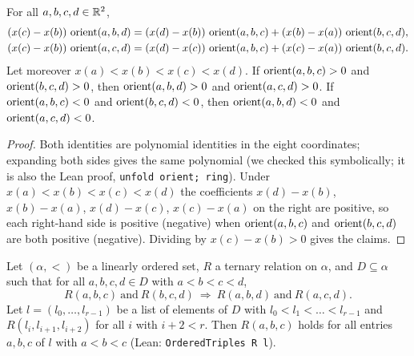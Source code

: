 \begin{lemma}\label{mb:lem:four}\raggedright
For all $a,b,c,d\in\mathbb R^2$,
\begin{align}
(x(c)-x(b))\,\operatorname{orient}(a,b,d)&=(x(d)-x(b))\,\operatorname{orient}(a,b,c)+(x(b)-x(a))\,\operatorname{orient}(b,c,d),\label{mb:eq:four-left}\\
(x(c)-x(b))\,\operatorname{orient}(a,c,d)&=(x(d)-x(c))\,\operatorname{orient}(a,b,c)+(x(c)-x(a))\,\operatorname{orient}(b,c,d).\label{mb:eq:four-right}
\end{align}
Let moreover $x(a)<x(b)<x(c)<x(d)$. If $\operatorname{orient}(a,b,c)>0$ and $\operatorname{orient}(b,c,d)>0$, then $\operatorname{orient}(a,b,d)>0$ and
$\operatorname{orient}(a,c,d)>0$. If $\operatorname{orient}(a,b,c)<0$ and $\operatorname{orient}(b,c,d)<0$, then $\operatorname{orient}(a,b,d)<0$ and $\operatorname{orient}(a,c,d)<0$.
\end{lemma}

\begin{proof}
Both identities are polynomial identities in the eight coordinates; expanding both sides gives the same polynomial (we
checked this symbolically; it is also the Lean proof, \texttt{unfold orient; ring}). Under $x(a)<x(b)<x(c)<x(d)$ the
coefficients $x(d)-x(b)$, $x(b)-x(a)$, $x(d)-x(c)$, $x(c)-x(a)$ on the right are positive, so each right-hand side is
positive (negative) when $\operatorname{orient}(a,b,c)$ and $\operatorname{orient}(b,c,d)$ are both positive (negative). Dividing by
$x(c)-x(b)>0$ gives the claims.
\end{proof}

\begin{lemma}\label{mb:lem:chain}\raggedright
Let $(\alpha,<)$ be a linearly ordered set, $R$ a ternary relation on $\alpha$, and $D\subseteq\alpha$ such that for all
$a,b,c,d\in D$ with $a<b<c<d$,
\begin{equation}\label{mb:eq:trans}
R(a,b,c)\ \text{and}\ R(b,c,d)\ \Longrightarrow\ R(a,b,d)\ \text{and}\ R(a,c,d).
\end{equation}
Let $l=(l_0,\dots,l_{r-1})$ be a list of elements of $D$ with $l_0<l_1<\dots<l_{r-1}$ and
$R(l_i,l_{i+1},l_{i+2})$ for all $i$ with $i+2<r$. Then $R(a,b,c)$ holds for all entries $a,b,c$ of $l$ with $a<b<c$
(Lean: \texttt{OrderedTriples R l}).
\end{lemma}

